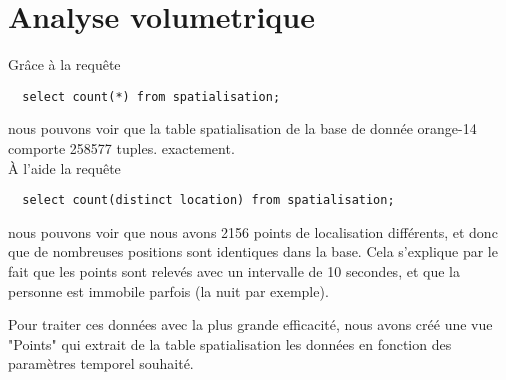 \chapter{Analyse volumetrique}

Grâce à la requête
\begin{verbatim}
  select count(*) from spatialisation;
\end{verbatim}
nous pouvons voir que la table spatialisation de la base de donnée orange-14 comporte 258577 tuples. exactement. \\
À l'aide la requête
\begin{verbatim}
  select count(distinct location) from spatialisation;
\end{verbatim}
nous pouvons voir que nous avons 2156 points de localisation différents, et donc que de nombreuses positions sont identiques dans la base. Cela s'explique par le fait que les points sont relevés avec un intervalle de 10 secondes, et que la personne est immobile parfois (la nuit par exemple).

Pour traiter ces données avec la plus grande efficacité, nous avons créé une vue "Points" qui extrait de la table spatialisation les données en fonction des paramètres temporel souhaité.
